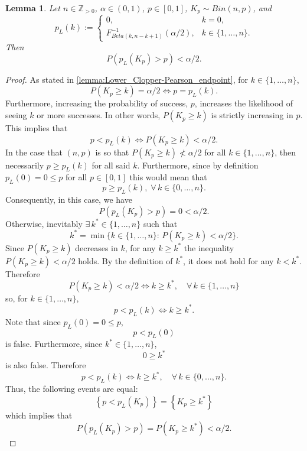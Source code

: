 \documentclass{article}
\newtheorem{lemma}{Lemma}
\begin{document}
\begin{lemma}\label{lemma:lower-endpoint-probability-inequality}
Let $n\in\mathbb{Z}_{>0}$, $\alpha\in(0,1)$, $p\in[0,1]$, $K_p\sim Bin(n,p)$, and 
$$p_L(k):= \begin{cases}
    0, &k=0,\\
    F^{-1}_{Beta(k,n-k+1)}(\alpha/2), &k\in\{1,\ldots,n\}.
\end{cases}$$
Then
$$P(p_L(K_p)>p)<\alpha/2.$$
\end{lemma}
\begin{proof}
As stated in \autoref{lemma:Lower_Clopper-Pearson_endpoint}, for $k\in\{1,\ldots,n\}$, 
$$P(K_p\geq k)=\alpha/2 \Leftrightarrow p=p_L(k).$$
Furthermore, increasing the probability of success, $p$, increases the likelihood of seeing $k$ or more successes. In other words, $P(K_p \geq k)$ is strictly increasing in $p$.
This implies that 
$$p<p_L(k) \Leftrightarrow P(K_p \geq k)<\alpha/2.$$
In the case that $(n,p)$ is so that $P(K_p\geq k) \nless \alpha/2$ for all $k\in\{1,\ldots,n\}$, then necessarily $p\geq p_L(k)$ for all said $k$.
Furthermore, since by definition $p_L(0)=0 \leq p$ for all $p\in [0,1]$ this would mean that
$$p\geq p_L(k),\;\forall \,k\in \{0,\ldots, n\}.$$
Consequently, in this case, we have
$$P(p_L(K_p)>p)=0<\alpha/2.$$
Otherwise, inevitably $\exists\, k^*\in\{1,\ldots,n\}$ such that
$$k^*=\min\{k\in\{1,\ldots,n\}:\,P(K_p\geq k)<\alpha/2\}.$$
Since $P(K_p\geq k)$ decreases in $k$, for any $k\geq k^*$ the inequality $P(K_p \geq k)<\alpha /2$ holds. By the definition of $k^*$, it does not hold for any $k<k^*$. Therefore
$$P(K_p \geq k) <\alpha /2 \Leftrightarrow k\geq k^*,\quad \forall\,k\in\{1,\ldots,n\}$$
so, for $k\in\{1,\ldots,n\}$,
$$p<p_L(k)\Leftrightarrow k\geq k^*.$$
Note that since $p_L(0)=0\leq p$,
$$p<p_L(0)$$
is false. Furthermore, since $k^*\in\{1,\ldots,n\}$,
$$0\geq k^*$$
is also false. Therefore
$$p<p_L(k)\Leftrightarrow k\geq k^*,\quad\forall\,k\in\{0,\ldots,n\}.$$
Thus, the following events are equal:
$$\left\{p<p_L(K_p)\right\}=\left\{K_p\geq k^*\right\}$$
which implies that
$$P(p_L(K_p)>p)=P(K_p\geq k^*)<\alpha/2.$$
\end{proof}
\end{document}
